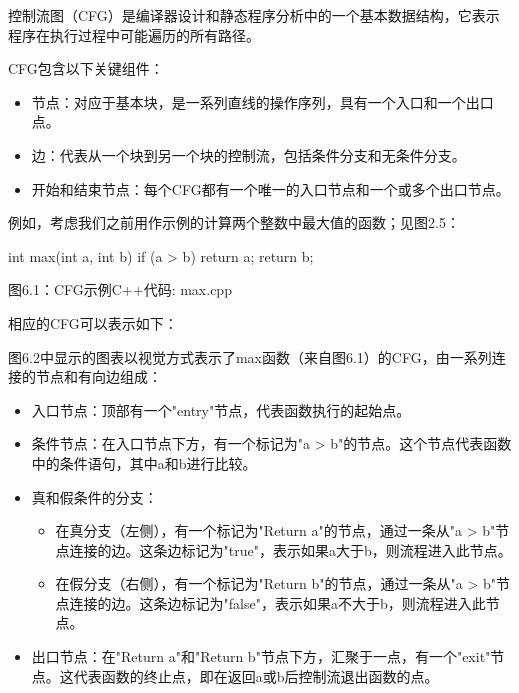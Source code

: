 控制流图（CFG）是编译器设计和静态程序分析中的一个基本数据结构，它表示程序在执行过程中可能遍历的所有路径。

CFG包含以下关键组件：

\begin{itemize}
\item
节点：对应于基本块，是一系列直线的操作序列，具有一个入口和一个出口点。

\item
边：代表从一个块到另一个块的控制流，包括条件分支和无条件分支。

\item
开始和结束节点：每个CFG都有一个唯一的入口节点和一个或多个出口节点。
\end{itemize}

例如，考虑我们之前用作示例的计算两个整数中最大值的函数；见图2.5：

\begin{cpp}
int max(int a, int b) {
  if (a > b)
    return a;
  return b;
}
\end{cpp}

\begin{center}
图6.1：CFG示例C++代码: max.cpp
\end{center}

相应的CFG可以表示如下：


图6.2中显示的图表以视觉方式表示了max函数（来自图6.1）的CFG，由一系列连接的节点和有向边组成：


\begin{itemize}
\item
入口节点：顶部有一个"entry"节点，代表函数执行的起始点。

\item
条件节点：在入口节点下方，有一个标记为"a > b"的节点。这个节点代表函数中的条件语句，其中a和b进行比较。

\item
真和假条件的分支：
\begin{itemize}
\item
在真分支（左侧），有一个标记为"Return a"的节点，通过一条从"a > b"节点连接的边。这条边标记为"true"，表示如果a大于b，则流程进入此节点。

\item
在假分支（右侧），有一个标记为"Return b"的节点，通过一条从"a > b"节点连接的边。这条边标记为"false"，表示如果a不大于b，则流程进入此节点。
\end{itemize}

\item
出口节点：在"Return a"和"Return b"节点下方，汇聚于一点，有一个"exit"节点。这代表函数的终止点，即在返回a或b后控制流退出函数的点。
\end{itemize}

